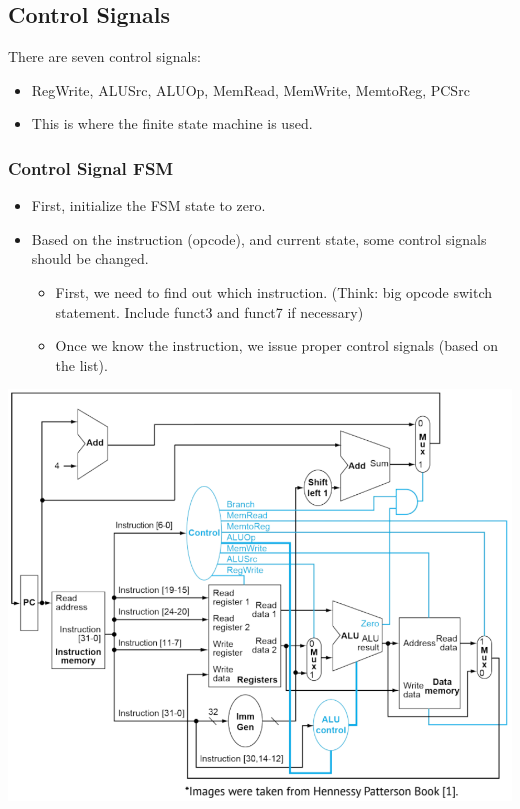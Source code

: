 \documentclass[10pt]{article}
\begin{document}
\subsection*{Control Signals}
There are seven control signals:
\begin{itemize}
    \item RegWrite, ALUSrc, ALUOp, MemRead, MemWrite, MemtoReg, PCSrc
    \item This is where the finite state machine is used.
\end{itemize}
\subsubsection*{Control Signal FSM}
\begin{itemize}
    \item First, initialize the FSM state to zero.
    \item Based on the instruction (opcode), and current state, some control signals should be changed.
    \begin{itemize}
        \item First, we need to find out which instruction.  (Think: big opcode switch statement.  Include funct3 and funct7 if necessary)
        \item Once we know the instruction, we issue proper control signals (based on the list).
    \end{itemize}
\end{itemize}
\begin{center}
    \includegraphics*[scale=0.7]{W2_12.png}
\end{center}
\end{document}
